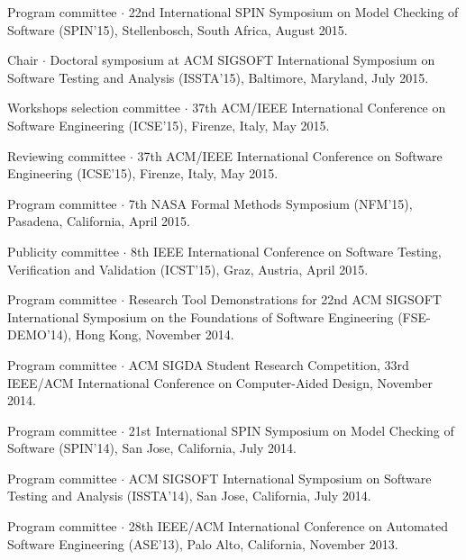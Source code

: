 \documentclass[ComputerScience]{vita}
\begin{document}
\begin{vita}
\begin{Panel and Committee Service}
\item Program committee $\cdot$ 22nd International SPIN Symposium on Model Checking of Software (SPIN'15), Stellenbosch, South Africa, August 2015.
\item Chair $\cdot$ Doctoral symposium at ACM SIGSOFT International Symposium on Software Testing and Analysis (ISSTA'15), Baltimore, Maryland, July 2015. 
\item Workshops selection committee $\cdot$ 37th ACM/IEEE International Conference on Software Engineering (ICSE'15), Firenze, Italy, May 2015.
\item Reviewing committee $\cdot$ 37th ACM/IEEE International Conference on Software Engineering (ICSE'15), Firenze, Italy, May 2015.
\item Program committee $\cdot$ 7th NASA Formal Methods Symposium (NFM'15), Pasadena, California, April 2015. 
\item Publicity committee $\cdot$ 8th IEEE International Conference on Software Testing, Verification and Validation (ICST'15), Graz, Austria, April 2015.
\item Program committee $\cdot$ Research Tool Demonstrations for 22nd ACM
  SIGSOFT International Symposium on the Foundations of Software
  Engineering (FSE-DEMO'14), Hong Kong, November 2014.
\item Program committee $\cdot$ ACM SIGDA Student Research Competition, 33rd IEEE/ACM International Conference on Computer-Aided Design, November 2014.
\item Program committee $\cdot$ 21st International SPIN Symposium on Model Checking of Software (SPIN'14), San Jose, California, July 2014.
\item Program committee $\cdot$ ACM SIGSOFT International Symposium on Software Testing and Analysis (ISSTA'14), San Jose, California, July 2014.
\item Program committee $\cdot$ 28th IEEE/ACM International Conference on Automated Software Engineering (ASE'13), Palo Alto, California, November 2013.

\end{Panel and Committee Service}
\end{vita}
\end{document}
